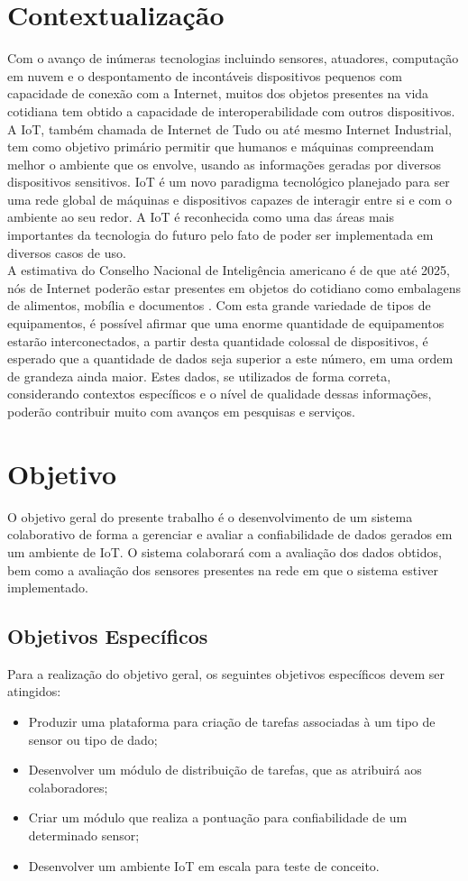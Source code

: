 \section{Contextualização}
\qquad
Com o avanço de inúmeras tecnologias incluindo sensores, atuadores, computação em nuvem e o despontamento de
incontáveis dispositivos pequenos com capacidade de conexão com a Internet, muitos dos objetos presentes
na vida cotidiana tem obtido a capacidade de interoperabilidade com outros dispositivos.
\\ \null
\qquad
A \acrfull{IoT}, também chamada de Internet de Tudo ou até mesmo Internet Industrial, tem como objetivo primário
permitir que humanos e máquinas compreendam melhor o ambiente que os envolve, usando as informações geradas por
diversos dispositivos sensitivos. \acrshort{IoT} é um novo paradigma tecnológico planejado para ser uma rede
global de máquinas e dispositivos capazes de interagir entre si e com o ambiente ao seu redor.
A \acrshort{IoT} é reconhecida como uma das áreas mais importantes da tecnologia do futuro pelo fato de
poder ser implementada em diversos casos de uso.
\\ \null
\qquad A estimativa do Conselho Nacional de Inteligência americano é de que até 2025, nós de Internet poderão estar presentes
em objetos do cotidiano como embalagens de alimentos, mobília e documentos \cite{intelsix}. Com esta grande variedade de tipos de equipamentos,
é possível afirmar que uma enorme quantidade de equipamentos estarão interconectados, a partir desta quantidade
colossal de dispositivos, é esperado que a quantidade de dados seja superior a este número, em uma ordem de grandeza ainda maior.
Estes dados, se utilizados de forma correta, considerando contextos específicos e o nível de qualidade dessas informações, poderão
contribuir muito com avanços em pesquisas e serviços.
\section{Objetivo}
\qquad O objetivo geral do presente trabalho é o desenvolvimento de um sistema colaborativo de forma a gerenciar e avaliar a confiabilidade de dados
gerados em um ambiente de \acrlong{IoT}. O sistema colaborará com a avaliação dos dados obtidos, bem como a avaliação
dos sensores presentes na rede em que o sistema estiver implementado.
\subsection{Objetivos Específicos}
Para a realização do objetivo geral, os seguintes objetivos específicos devem ser atingidos:
\begin{itemize}
  \item Produzir uma plataforma para criação de tarefas associadas à um tipo de sensor ou tipo de dado;
  \item Desenvolver um módulo de distribuição de tarefas, que as atribuirá aos colaboradores;
  \item Criar um módulo que realiza a pontuação para confiabilidade de um determinado sensor;
  \item Desenvolver um ambiente \acrshort{IoT} em escala para teste de conceito.
\end{itemize}
